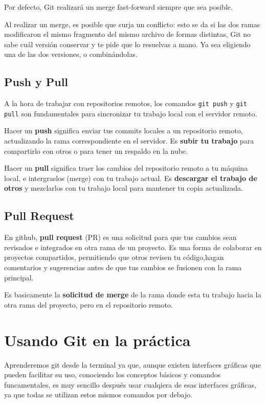 \documentclass[a4paper,12pt]{report}
\begin{document}
Por defecto, Git realizará un merge fast-forward siempre que sea posible.

Al realizar un merge, es posible que surja un conflicto: esto se da si las dos ramas modificaron
el mismo fragmento del mismo archivo de formas distintas, Git no sabe cuál versión conservar y te
pide que lo resuelvas a mano. Ya sea eligiendo una de las dos versiones, o combinándolas.

\section{Push y Pull}

A la hora de trabajar con repositorios remotos, los comandos \texttt{git push} y \texttt{git pull} son fundamentales
para sincronizar tu trabajo local con el servidor remoto.

Hacer un \textbf{push} significa enviar tus commits locales a un repositorio remoto, actualizando la rama correspondiente
en el servidor. Es \textbf{subir tu trabajo} para compartirlo con otros o para tener un respaldo en la nube.

Hacer un \textbf{pull} significa traer los cambios del repositorio remoto a tu máquina local, e intergraslos (merge) con
tu trabajo actual. Es \textbf{descargar el trabajo de otros} y mezclarlos con tu trabajo local para mantener tu copia actualizada.

\section{Pull Request}
En github, \textbf{pull request} (PR) es una solicitud para que tus cambios sean revisados e integrados en otra rama de un proyecto.
Es una forma de colaborar en proyectos compartidos, permitiendo que otros revisen tu código,hagan comentarios y sugerencias antes de
que tus cambios se fusionen con la rama principal.

Es basicamente la \textbf{solicitud de merge} de la rama donde esta tu trabajo hacia la otra rama del proyecto, pero en el repositorio remoto.

\chapter{Usando Git en la práctica}
Aprenderemos git desde la terminal ya que, aunque existen interfaces gráficas que pueden facilitar su uso, conociendo los conceptos
básicos y comandos funcamentales, es muy sencillo después usar cualqiera de esas interfaces gráficas, ya que todas se utilizan estos
mismos comandos por debajo.
\end{document}
